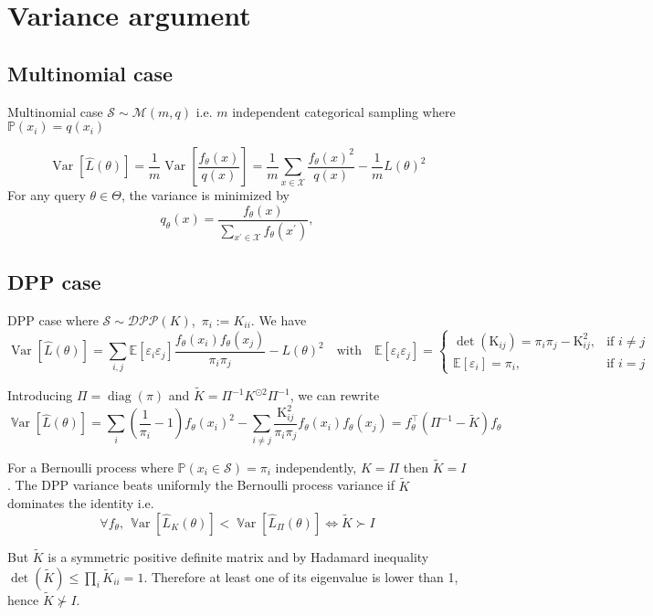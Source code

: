 \documentclass{article}
\renewcommand{\epsilon}{\varepsilon}
\newcommand{\Var}{\operatorname{\mathbb V ar}}
\theoremstyle{definition}
\begin{document}
\section{Variance argument}
\subsection{Multinomial case}
Multinomial case $\mathcal S \sim \mathcal M(m, q)$ i.e. $m$ independent categorical sampling where $\mathbb P(x_i)  = q(x_i)$

$$
	\operatorname{Var}[\hat L(\theta)] =\frac{1}{m} \operatorname{Var}\left[\frac {f_{\theta}(x)} {q(x)}\right] 
	=\frac{1}{m} \sum_{x \in \mathcal{X}} \frac{f_{\theta}(x)^{2}}{q(x)} -\frac{1}{m} L(\theta)^{2}
$$
For any query $\theta \in \Theta$, the variance is minimized by
$$
q_{\theta}(x)=\frac{ f_{\theta}(x)}{\sum_{x^{\prime} \in \mathcal{X}}  f_{\theta}\left(x^{\prime}\right)},
$$

\subsection{DPP case}
DPP case where $ \mathcal S \sim \mathcal{DPP}(K)$, \,$\pi_i := K_{ii}$. We have
$$
\operatorname{Var}[\hat L(\theta)]
=\sum_{i, j}\mathbb{E}\left[\epsilon_{i} \epsilon_{j}\right] \frac{f_\theta(x_{i}) f_\theta(x_{j})} {\pi_{i} \pi_{j}}  - L(\theta)^{2}
\quad \text{with} \quad
\mathbb{E}\left[\epsilon_{i} \epsilon_{j}\right]=
\begin{cases}
	\det\left(\mathrm{K}_{ij}\right)=\pi_{i} \pi_{j}-\mathrm{K}_{i j}^{2}, & \text{if } i \neq j \\
	\mathbb{E}\left[\epsilon_{i}\right]=\pi_{i}, & \text{if } i = j
\end{cases}
$$



Introducing $\Pi = \operatorname{diag}(\pi)$ and $\tilde K = \Pi^{-1}K^{\odot 2} \Pi^{-1}$, we can rewrite  
$$
\Var [\hat L(\theta)]=\sum_{i}\left(\frac{1}{\pi_{i}}-1\right) f_\theta(x_{i})^{2}-\sum_{i \neq j} \frac{\mathrm{K}_{i j}^{2}}{\pi_{i} \pi_{j}} f_\theta(x_{i}) f_\theta(x_{j}) =  f_\theta^\top (\Pi^{-1}  - \tilde{K}) f_\theta 
$$

	
For a Bernoulli process where $\mathbb P(x_i \in \mathcal S) = \pi_i$ independently, $K = \Pi$ then $\tilde K = I$. The DPP variance beats uniformly the Bernoulli process variance if $\tilde K$ dominates the identity i.e. 
$$ \forall f_\theta, \, \Var [\hat L_{K}(\theta)] < \Var [\hat L_{\Pi}(\theta)] \iff \tilde K \succ I$$

But $\tilde K$ is a symmetric positive definite matrix and by Hadamard inequality $\det( \tilde K) \leq \prod_{i} \tilde K_{ii}= 1$. Therefore at least one of its eigenvalue is lower than 1, hence $\tilde K \nsucc I$.
	
	
	
	
	\vfill
	
	
	\printbibliography
%	 
%	 
	
\end{document}
